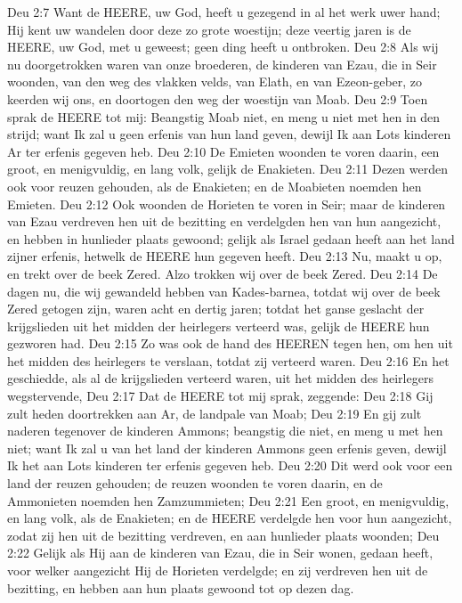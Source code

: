 Deu 2:7  Want de HEERE, uw God, heeft u gezegend in al het werk uwer hand; Hij kent uw wandelen door deze zo grote woestijn; deze veertig jaren is de HEERE, uw God, met u geweest; geen ding heeft u ontbroken.
Deu 2:8  Als wij nu doorgetrokken waren van onze broederen, de kinderen van Ezau, die in Seir woonden, van den weg des vlakken velds, van Elath, en van Ezeon-geber, zo keerden wij ons, en doortogen den weg der woestijn van Moab.
Deu 2:9  Toen sprak de HEERE tot mij: Beangstig Moab niet, en meng u niet met hen in den strijd; want Ik zal u geen erfenis van hun land geven, dewijl Ik aan Lots kinderen Ar ter erfenis gegeven heb.
Deu 2:10  De Emieten woonden te voren daarin, een groot, en menigvuldig, en lang volk, gelijk de Enakieten.
Deu 2:11  Dezen werden ook voor reuzen gehouden, als de Enakieten; en de Moabieten noemden hen Emieten.
Deu 2:12  Ook woonden de Horieten te voren in Seir; maar de kinderen van Ezau verdreven hen uit de bezitting en verdelgden hen van hun aangezicht, en hebben in hunlieder plaats gewoond; gelijk als Israel gedaan heeft aan het land zijner erfenis, hetwelk de HEERE hun gegeven heeft.
Deu 2:13  Nu, maakt u op, en trekt over de beek Zered. Alzo trokken wij over de beek Zered.
Deu 2:14  De dagen nu, die wij gewandeld hebben van Kades-barnea, totdat wij over de beek Zered getogen zijn, waren acht en dertig jaren; totdat het ganse geslacht der krijgslieden uit het midden der heirlegers verteerd was, gelijk de HEERE hun gezworen had.
Deu 2:15  Zo was ook de hand des HEEREN tegen hen, om hen uit het midden des heirlegers te verslaan, totdat zij verteerd waren.
Deu 2:16  En het geschiedde, als al de krijgslieden verteerd waren, uit het midden des heirlegers wegstervende,
Deu 2:17  Dat de HEERE tot mij sprak, zeggende:
Deu 2:18  Gij zult heden doortrekken aan Ar, de landpale van Moab;
Deu 2:19  En gij zult naderen tegenover de kinderen Ammons; beangstig die niet, en meng u met hen niet; want Ik zal u van het land der kinderen Ammons geen erfenis geven, dewijl Ik het aan Lots kinderen ter erfenis gegeven heb.
Deu 2:20  Dit werd ook voor een land der reuzen gehouden; de reuzen woonden te voren daarin, en de Ammonieten noemden hen Zamzummieten;
Deu 2:21  Een groot, en menigvuldig, en lang volk, als de Enakieten; en de HEERE verdelgde hen voor hun aangezicht, zodat zij hen uit de bezitting verdreven, en aan hunlieder plaats woonden;
Deu 2:22  Gelijk als Hij aan de kinderen van Ezau, die in Seir wonen, gedaan heeft, voor welker aangezicht Hij de Horieten verdelgde; en zij verdreven hen uit de bezitting, en hebben aan hun plaats gewoond tot op dezen dag.
